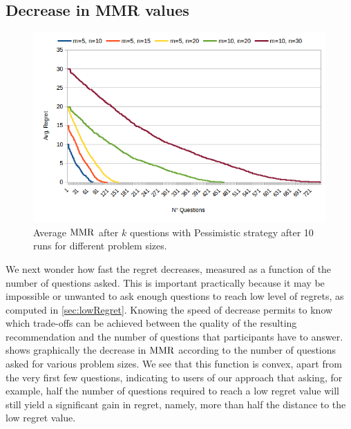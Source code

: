\documentclass[sigconf, anonymous]{aamas}
\begin{document}
\subsection{Decrease in MMR values}
\begin{figure}
	\centering
	\includegraphics[width=.45\textwidth]{linearity.png}
	\caption{Average $\operatorname{MMR}$ after $k$ questions with Pessimistic strategy after 10 runs for different problem sizes.}
	\label{fig:linearity}
\end{figure}

We next wonder how fast the regret decreases, measured as a function of the number of questions asked. This is important practically because it may be impossible or unwanted to ask enough questions to reach low level of regrets, as computed in \cref{sec:lowRegret}. Knowing the speed of decrease permits to know which trade-offs can be achieved between the quality of the resulting recommendation and the number of questions that participants have to answer.  shows graphically the decrease in $\operatorname{MMR}$ according to the number of questions asked for various problem sizes. We see that this function is convex, apart from the very first few questions, indicating to users of our approach that asking, for example, half the number of questions required to reach a low regret value will still yield a significant gain in regret, namely, more than half the distance to the low regret value.
\end{document}
